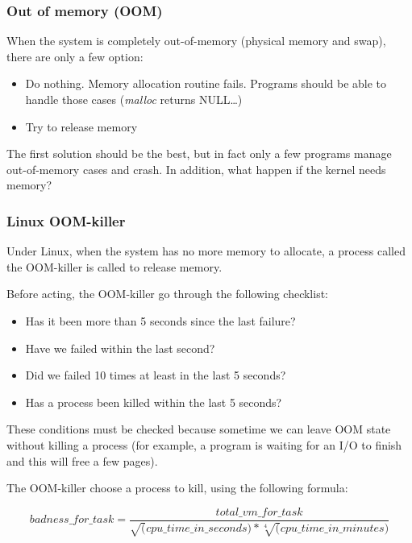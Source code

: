 \begin{frame}
  \frametitle{Out of memory (OOM)}

  When the system is completely out-of-memory (physical memory and
  swap), there are only a few option:

  \begin{itemize}
  \item
    Do nothing. Memory allocation routine fails. Programs should be
    able to handle those cases (\emph{malloc} returns NULL\ldots)
  \item
    Try to release memory
  \end{itemize}

  \-

  The first solution should be the best, but in fact only a few
  programs manage out-of-memory cases and crash. In addition, what
  happen if the kernel needs memory?

\end{frame}


\begin{frame}
  \frametitle{Linux OOM-killer}

  Under Linux, when the system has no more memory to allocate, a
  process called the OOM-killer is called to release memory.

  \-

  Before acting, the OOM-killer go through the following checklist:

  \begin{itemize}
  \item
    Has it been more than 5 seconds since the last failure?
  \item
    Have we failed within the last second?
  \item
    Did we failed 10 times at least in the last 5 seconds?
  \item
    Has a process been killed within the last 5 seconds?
  \end{itemize}

  \-

  These conditions must be checked because sometime we can leave OOM
  state without killing a process (for example, a program is waiting
  for an I/O to finish and this will free a few pages).

  \-

  The OOM-killer choose a process to kill, using the following
  formula:

  $$badness\_for\_task = \frac{total\_vm\_for\_task}
  {\sqrt(cpu\_time\_in\_seconds) * \sqrt[4](cpu\_time\_in\_minutes)}$$

\end{frame}

